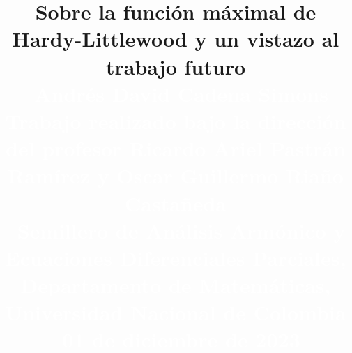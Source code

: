   \skip{}\baselineskip
\def\baselinestretch{1.05}
\parindent0pt

\def\thepage{}

\renewcommand{\footnoterule}{\textcolor{blue}{\rule{0.587\columnwidth}{0.02in}}\vspace*{5mm}}
\title{\color{White}\bfseries {\huge{Sobre la función máximal de Hardy-Littlewood y un vistazo al trabajo futuro}}\\\
	\normalsize\textcolor{White}{\huge{Andrés David Cadena Simons}} \\
	\textcolor{White}{\large{Trabajo realizado bajo la dirección del profesor Ricardo Ariel Pastrán Ramírez y Oscar Guillermo Riaño Castañeda}} \\\
	\normalsize \textcolor{White}{\large{Semillero de Análisis Armónico y Ecuaciones Diferenciales Parciales, Departamento de Matemáticas, Universidad Nacional de Colombia}}\\\
	\textcolor{White}{\large{01 de diciembre de 2023}}\\\    
}
\author{}
\date{}
\advance
{}
\columnsep=2cm %